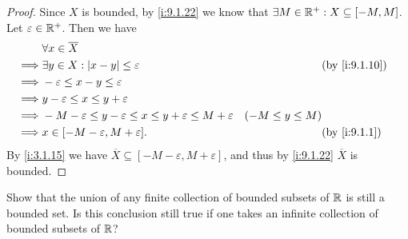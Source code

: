 \begin{proof}
  Since \(X\) is bounded, by \cref{i:9.1.22} we know that \(\exists M \in \mathbb{R}^+ : X \subseteq [-M, M]\).
  Let \(\varepsilon \in \mathbb{R}^+\).
  Then we have
  \begin{align*}
             & \forall x \in \overline{X}                                                                                                  \\
    \implies & \exists y \in X : \abs{x - y} \leq \varepsilon                                         &                    & \by{i:9.1.10} \\
    \implies & -\varepsilon \leq x - y \leq \varepsilon                                                                                    \\
    \implies & y - \varepsilon \leq x \leq y + \varepsilon                                                                                 \\
    \implies & -M - \varepsilon \leq y - \varepsilon \leq x \leq y + \varepsilon \leq M + \varepsilon & (-M \leq y \leq M)                 \\
    \implies & x \in [-M - \varepsilon, M + \varepsilon].                                             &                    & \by{i:9.1.1}
  \end{align*}
  By \cref{i:3.1.15} we have \(\overline{X} \subseteq [-M - \varepsilon, M + \varepsilon]\), and thus by \cref{i:9.1.22} \(\overline{X}\) is bounded.
\end{proof}

\begin{ex}\label{i:ex:9.1.12}
  Show that the union of any finite collection of bounded subsets of \(\mathbb{R}\) is still a bounded set.
  Is this conclusion still true if one takes an infinite collection of bounded subsets of \(\mathbb{R}\)?
\end{ex}

